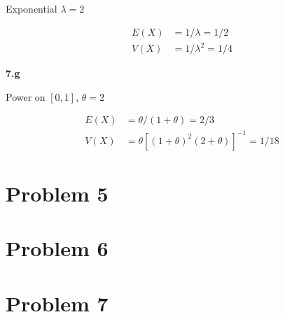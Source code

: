 \documentclass{article}
\newcommand{\1}{\mathbf{1}}
\begin{document}
Exponential $\lambda=2$

\begin{align*}
E(X) &= 1/\lambda = 1/2 \\
V(X) &= 1/\lambda^2 = 1/4
\end{align*}

\vspace{\baselineskip}
\noindent \textbf{\large 7.g}

Power on $[0,1]$, $\theta=2$

\begin{align*}
E(X) &= \theta/(1+\theta) = 2/3 \\
V(X) &= \theta\left[ (1+\theta)^2(2+\theta)\right]^{-1} = 1/18
\end{align*}


\newpage
\section*{Problem 5}


\newpage
\section*{Problem 6}


\newpage
\section*{Problem 7}
\end{document}
